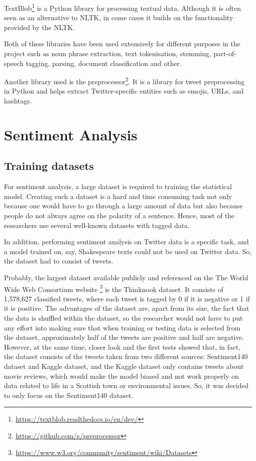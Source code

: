 TextBlob\footnote{\url{https://textblob.readthedocs.io/en/dev/}} is a Python library for processing textual data. Although it is often seen as an alternative to NLTK, in come cases it builds on the functionality provided by the NLTK. 

Both of these libraries have been used extensively for different purposes in the project such as noun phrase extraction, text tokenisation, stemming, part-of-speech tagging, parsing, document classification and other. 

Another library used is the preprocessor\footnote{\url{https://github.com/s/preprocessor}}. It is a library for tweet preprocessing in Python and helps extract Twitter-specific entities such as emojis, URLs, and hashtags.

\section{Sentiment Analysis}
\label{sec:sa}

\subsection{Training datasets}

For sentiment analysis, a large dataset is required to training the statistical model. Creating such a dataset is a hard and time consuming task not only because one would have to go through a large amount of data but also because people do not always agree on the polarity of a sentence. Hence, most of the researchers use several well-known datasets with tagged data. 

In addition, performing sentiment analysis on Twitter data is a specific task, and a model trained on, say, Shakespeare texts could not be used on Twitter data. So, the dataset had to consist of tweets.

Probably, the largest dataset available publicly and referenced on the The World Wide Web Consortium website \footnote{\url{https://www.w3.org/community/sentiment/wiki/Datasets}} is the Thinknook dataset. It consists of 1,578,627 classified tweets, where each tweet is tagged by 0 if it is negative or 1 if it is positive. The advantages of the dataset are, apart from its size, the fact that the data is shuffled within the dataset, so the researcher would not have to put any effort into making sure that when training or testing data is selected from the dataset, approximately half of the tweets are positive and half are negative. However, at the same time, closer look and the first tests showed that, in fact, the dataset consists of the tweets taken from two different sources: Sentiment140 dataset and Kaggle dataset, and the Kaggle dataset only contains tweets about movie reviews, which would make the model biased and not work properly on data related to life in a Scottish town or environmental issues. So, it was decided to only focus on the Sentiment140 dataset.

